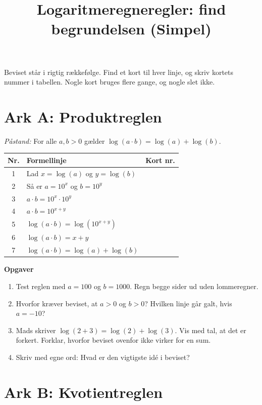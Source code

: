 \documentclass[a4paper,11pt]{article}
\date{}
\title{Logaritmeregneregler: find begrundelsen (Simpel)}
\begin{document}
\maketitle
Beviset står i rigtig rækkefølge. Find et kort til hver linje, og skriv kortets nummer i tabellen. Nogle kort bruges flere gange, og nogle slet ikke.

\newpage
\section*{Ark A: Produktreglen}
\label{sec:orgdaea466}

\emph{Påstand:} For alle \(a,b>0\) gælder \(\log(a\cdot b)=\log(a)+\log(b)\).

\begin{center}
\begin{tabular}{|c|l|p{3cm}|}
\hline
Nr. & Formellinje & Kort nr.\\
\hline
1 & Lad \(x=\log(a)\) og \(y=\log(b)\) & \\
2 & Så er \(a=10^x\) og \(b=10^y\) & \\
3 & \(a\cdot b=10^x\cdot 10^y\) & \\
4 & \(a\cdot b=10^{x+y}\) & \\
5 & \(\log(a\cdot b)=\log(10^{x+y})\) & \\
6 & \(\log(a\cdot b)=x+y\) & \\
7 & \(\log(a\cdot b)=\log(a)+\log(b)\) & \\
\hline
\end{tabular}
\end{center}

\textbf{Opgaver}
\begin{enumerate}
\item Test reglen med \(a=100\) og \(b=1000\). Regn begge sider ud uden lommeregner.
\item Hvorfor kræver beviset, at \(a>0\) og \(b>0\)? Hvilken linje går galt, hvis \(a=-10\)?
\item Mads skriver \(\log(2+3)=\log(2)+\log(3)\). Vis med tal, at det er forkert. Forklar, hvorfor beviset ovenfor ikke virker for en sum.
\item Skriv med egne ord: Hvad er den vigtigste idé i beviset?
\end{enumerate}

\newpage
\section*{Ark B: Kvotientreglen}
\label{sec:orgf09e78d}
\end{document}
